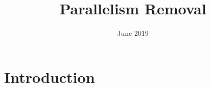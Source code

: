 \documentclass{article}
\title{Parallelism Removal}
\author{ }
\date{June 2019}
\begin{document}
\maketitle

\section{Introduction}
\end{document}
